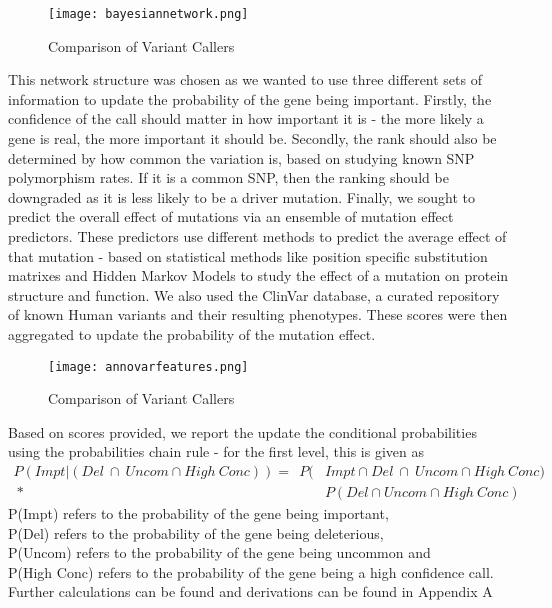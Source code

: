 \documentclass{article}
\begin{document}
\begin{figure}[H]
\texttt{[image: bayesiannetwork.png]}
\caption{Comparison of Variant Callers}
\centering
\end{figure}

This network structure was chosen as we wanted to use three different sets of information to update the probability of the gene being important. Firstly, the confidence of the call should matter in how important it is - the more likely a gene is real, the more important it should be. Secondly, the rank should also be determined by how common the variation is, based on studying known SNP polymorphism rates. If it is a common SNP, then the ranking should be downgraded as it is less likely to be a driver mutation. Finally, we sought to predict the overall effect of mutations via an ensemble of mutation effect predictors. These predictors use different methods to predict the average effect of that mutation - based on statistical methods like position specific substitution matrixes and Hidden Markov Models to study the effect of a mutation on protein structure and function. We also used the ClinVar database, a curated repository of known Human variants and their resulting phenotypes. These scores were then aggregated to update the probability of the mutation effect.

\begin{figure}[H]
\texttt{[image: annovarfeatures.png]}
\caption{Comparison of Variant Callers}
\centering
\end{figure}


Based on scores provided, we report the update the conditional probabilities using the probabilities chain rule - for the first level, this is given as \\
\begin{equation}
\begin{split}
P(Impt | (Del  \ \cap \ Uncom  \cap High\ Conc)) =  \ \ P(&Impt \cap Del  \ \cap \ Uncom \cap High \ Conc ) \\ \ * \ & P(Del  \cap Uncom  \cap High \ Conc )
\end{split}
\end{equation}
\tiny
\indent
P(Impt) refers to the probability of the gene being important,\\
\indent P(Del) refers to the probability of the gene being deleterious,\\ 
\indent P(Uncom) refers to the probability of the gene being uncommon and\\  \indent P(High Conc) refers to the probability of the gene being a high confidence call.\\ \indent Further calculations can be found and derivations can be found in Appendix A\\
\end{document}
